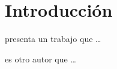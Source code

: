 \chapter*{Introducción}
\label{intro}


\cite{fuente1} presenta un trabajo que \ldots

\citeauthor{fuente2} es otro autor que \ldots




